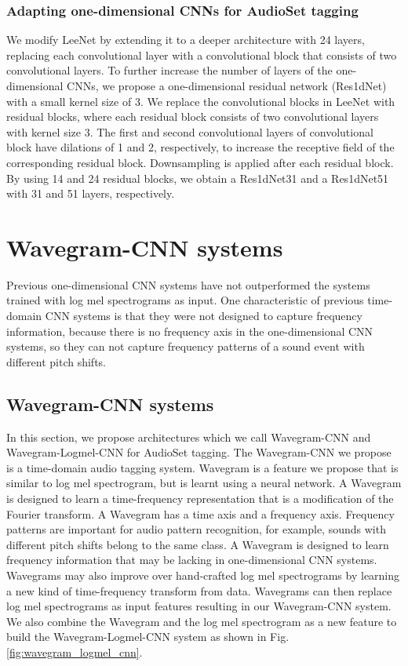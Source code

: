 \documentclass[journal]{IEEEtran}
\newcommand{\qk}[1] {{\color{black} #1}}
\begin{document}
\subsubsection{Adapting one-dimensional CNNs for AudioSet tagging}\label{section:one_dim_cnns}
We modify LeeNet by extending it to a deeper architecture with 24 layers, replacing each convolutional layer with a convolutional block that consists of two convolutional layers. To further increase the number of layers of the one-dimensional CNNs, we propose a one-dimensional residual network (Res1dNet) with a small kernel size of 3. We replace the convolutional blocks in LeeNet with residual blocks, where each residual block consists of two convolutional layers with kernel size 3. The first and second convolutional layers of convolutional block have dilations of 1 and 2, respectively, to increase the receptive field of the corresponding residual block. Downsampling is applied after each residual block. By using 14 and 24 residual blocks, we obtain a Res1dNet31 and a Res1dNet51 with 31 and 51 layers, respectively.



\section{Wavegram-CNN systems}\label{section:wavegram}

Previous one-dimensional CNN systems \cite{dai2017very}\cite{lee2017sample}\cite{pons2017end} have not outperformed the systems trained with log mel spectrograms as input. One characteristic of previous time-domain CNN systems \cite{dai2017very}\cite{lee2017sample} is that they were not designed to capture frequency information, because there is no frequency axis in the one-dimensional CNN systems, so they can not capture frequency patterns of a sound event with different pitch shifts.

\subsection{Wavegram-CNN systems}
\qk{In this section, we propose architectures which we call Wavegram-CNN and Wavegram-Logmel-CNN for AudioSet tagging. The Wavegram-CNN we propose is a time-domain audio tagging system. Wavegram is a feature we propose that is similar to log mel spectrogram, but is learnt using a neural network. A Wavegram is designed to learn a time-frequency representation that is a modification of the Fourier transform. A Wavegram has a time axis and a frequency axis. Frequency patterns are important for audio pattern recognition, for example, sounds with different pitch shifts belong to the same class. A Wavegram is designed to learn frequency information that may be lacking in one-dimensional CNN systems. Wavegrams may also improve over hand-crafted log mel spectrograms by learning a new kind of time-frequency transform from data. Wavegrams can then replace log mel spectrograms as input features resulting in our Wavegram-CNN system. We also combine the Wavegram and the log mel spectrogram as a new feature to build the Wavegram-Logmel-CNN system as shown in Fig. \ref{fig:wavegram_logmel_cnn}.}
\end{document}
